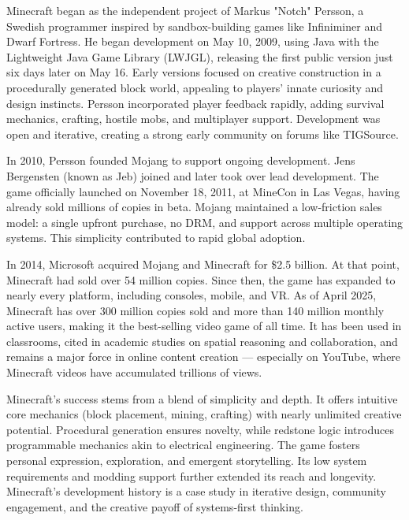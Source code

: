 \begin{historical}
Minecraft began as the independent project of Markus "Notch" Persson, a Swedish programmer inspired by sandbox-building games like Infiniminer and Dwarf Fortress. He began development on May 10, 2009, using Java with the Lightweight Java Game Library (LWJGL), releasing the first public version just six days later on May 16. Early versions focused on creative construction in a procedurally generated block world, appealing to players' innate curiosity and design instincts. Persson incorporated player feedback rapidly, adding survival mechanics, crafting, hostile mobs, and multiplayer support. Development was open and iterative, creating a strong early community on forums like TIGSource.

In 2010, Persson founded Mojang to support ongoing development. Jens Bergensten (known as Jeb) joined and later took over lead development. The game officially launched on November 18, 2011, at MineCon in Las Vegas, having already sold millions of copies in beta. Mojang maintained a low-friction sales model: a single upfront purchase, no DRM, and support across multiple operating systems. This simplicity contributed to rapid global adoption.

In 2014, Microsoft acquired Mojang and Minecraft for \$2.5 billion. At that point, Minecraft had sold over 54 million copies. Since then, the game has expanded to nearly every platform, including consoles, mobile, and VR. As of April 2025, Minecraft has over 300 million copies sold and more than 140 million monthly active users, making it the best-selling video game of all time. It has been used in classrooms, cited in academic studies on spatial reasoning and collaboration, and remains a major force in online content creation — especially on YouTube, where Minecraft videos have accumulated trillions of views.

Minecraft’s success stems from a blend of simplicity and depth. It offers intuitive core mechanics (block placement, mining, crafting) with nearly unlimited creative potential. Procedural generation ensures novelty, while redstone logic introduces programmable mechanics akin to electrical engineering. The game fosters personal expression, exploration, and emergent storytelling. Its low system requirements and modding support further extended its reach and longevity. Minecraft’s development history is a case study in iterative design, community engagement, and the creative payoff of systems-first thinking.
\end{historical}